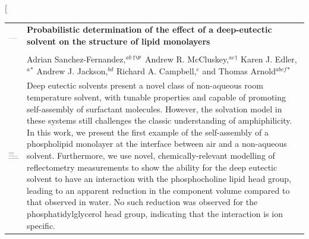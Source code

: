 \documentclass[twoside,twocolumn,9pt]{article}
\begin{document}
\twocolumn[
  \begin{@twocolumnfalse}
\vspace{3cm}
\sffamily
\begin{tabular}{m{4.5cm} p{13.5cm} }

\includegraphics{head_foot/DOI} & \noindent\LARGE{\textbf{Probabilistic determination of the effect of a deep-eutectic solvent on the structure of lipid monolayers}} \\%
\vspace{0.3cm} & \vspace{0.3cm} \\

 & \noindent\large{Adrian Sanchez-Fernandez,\textit{$^{ab}$}$^{\dag\P}$ Andrew R. McCluskey,\textit{$^{ac}$}$^{\dag}$ Karen J. Edler,\textit{$^{a}$}$^{\ast}$ Andrew J. Jackson,\textit{$^{bd}$} Richard A. Campbell,\textit{$^{e}$} and Thomas Arnold\textit{$^{abcf}$}$^{\ast}$} \\%

\includegraphics{head_foot/dates} & \noindent\normalsize{Deep eutectic solvents present a novel class of non-aqueous room temperature solvent, with tunable properties and capable of promoting self-assembly of surfactant molecules. However, the solvation model in these systems still challenges the classic understanding of amphiphilicity. In this work, we present the first example of the self-assembly of a phospholipid monolayer at the interface between air and a non-aqueous solvent. Furthermore, we use novel, chemically-relevant modelling of reflectometry measurements to show the ability for the deep eutectic solvent to have an interaction with the phosphocholine lipid head group, leading to an apparent reduction in the component volume compared to that observed in water. No such reduction was observed for the phosphatidylglycerol head group, indicating that the interaction is ion specific.} \\

\end{tabular}

	\end{@twocolumnfalse} \vspace{0.6cm}
\end{document}

